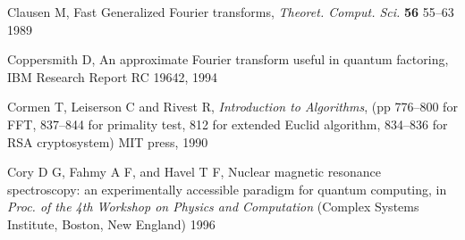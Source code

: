 \documentclass{article}
\begin{document}
\begin{thebibliography}{12}
Clausen M, 
Fast Generalized Fourier transforms, 
{\em Theoret. Comput. Sci.} {\bf 56} 55--63 1989 

% 
% 
% 
% 
% 
% 
% 
% 
% 
% 

Coppersmith D, 
An approximate Fourier transform useful in quantum factoring,
IBM Research Report RC 19642, 1994


Cormen T, Leiserson C and Rivest R, 
{\em Introduction to Algorithms}, 
 (pp 776--800 for FFT, 837--844 for primality test, 812 for extended Euclid 
algorithm, 834--836 for RSA cryptosystem) MIT press, 1990 


 Cory D G, Fahmy A F, and  Havel T F,
Nuclear magnetic resonance spectroscopy: an experimentally
accessible paradigm for quantum computing, in {\em Proc. of the 4th
Workshop on Physics and Computation} (Complex Systems Institute,
Boston, New England) 1996


% 
% 
% 
% 
% 
% 
% 
% 
% 
% 
% 


\end{thebibliography}
\end{document}
